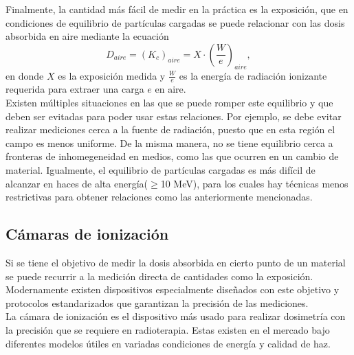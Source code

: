 Finalmente, la cantidad más fácil de medir en la práctica es la exposición, que en condiciones de equilibrio de partículas cargadas se puede relacionar con las dosis absorbida en aire mediante la ecuación \cite{Attix1986}
\begin{equation}
\label{eqn:ExpoDosis}
	D_{aire}=(K_c)_{aire}=X\cdot \left(\frac{W}{e}\right)_{aire},
\end{equation}
en donde $X$ es la exposición medida y  $\frac{W}{e}$ es la energía de radiación ionizante requerida para extraer una carga $e$ en aire.\\

Existen múltiples situaciones en las que se puede romper este equilibrio y que deben ser evitadas para poder usar estas relaciones. Por ejemplo, se debe evitar realizar mediciones cerca a la fuente de radiación, puesto que en esta región el campo es menos uniforme. De la misma manera, no se tiene equilibrio cerca a fronteras de inhomegeneidad en medios, como las que ocurren en un cambio de material. Igualmente, el equilibrio de partículas cargadas es más difícil de alcanzar en haces de alta energía($\geq$10 MeV), para los cuales hay técnicas menos restrictivas para obtener relaciones como las anteriormente mencionadas.  
\subsection{Cámaras de ionización}
Si se tiene el objetivo de medir la dosis absorbida en cierto punto de un material se puede recurrir a la medición directa de cantidades como la exposición. Modernamente existen dispositivos especialmente diseñados con este objetivo y protocolos estandarizados que garantizan la precisión de las mediciones. \\

La cámara de ionización es el dispositivo más usado para realizar dosimetría con la precisión que se requiere en radioterapia. Estas existen en el mercado bajo diferentes modelos útiles en variadas condiciones de energía y calidad de haz.\\

